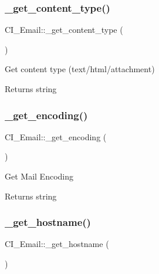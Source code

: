 \subsubsection{\texorpdfstring{\+\_\+get\+\_\+content\+\_\+type()}{\_get\_content\_type()}}
{\footnotesize\ttfamily C\+I\+\_\+\+Email\+::\+\_\+get\+\_\+content\+\_\+type (\begin{DoxyParamCaption}{ }\end{DoxyParamCaption})\hspace{0.3cm}{\ttfamily [protected]}}

Get content type (text/html/attachment)

\begin{DoxyReturn}{Returns}
string 
\end{DoxyReturn}
\mbox{\label{class_c_i___email_a895a792c44ccbf4675899347b9a492fc}} 
\subsubsection{\texorpdfstring{\+\_\+get\+\_\+encoding()}{\_get\_encoding()}}
{\footnotesize\ttfamily C\+I\+\_\+\+Email\+::\+\_\+get\+\_\+encoding (\begin{DoxyParamCaption}{ }\end{DoxyParamCaption})\hspace{0.3cm}{\ttfamily [protected]}}

Get Mail Encoding

\begin{DoxyReturn}{Returns}
string 
\end{DoxyReturn}
\mbox{\label{class_c_i___email_aa86dbf32fca65cbf48b61ea6b343506b}} 
\subsubsection{\texorpdfstring{\+\_\+get\+\_\+hostname()}{\_get\_hostname()}}
{\footnotesize\ttfamily C\+I\+\_\+\+Email\+::\+\_\+get\+\_\+hostname (\begin{DoxyParamCaption}{ }\end{DoxyParamCaption})\hspace{0.3cm}{\ttfamily [protected]}}

